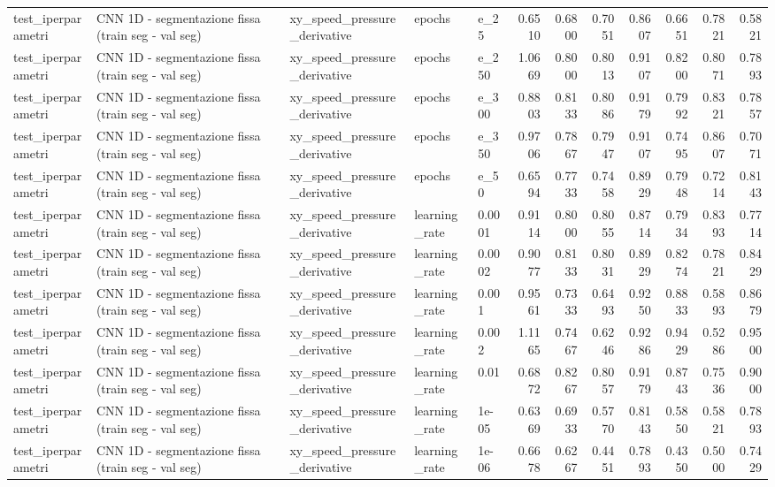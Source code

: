 \documentclass{article}
\begin{document}
\begin{table}[htbp]
\begin{adjustbox}{max width=\textwidth}
\begin{tabular}{lllllrrrrrrr}
test\_iperparametri & CNN 1D - segmentazione fissa (train seg - val seg) & xy\_speed\_pressure\_derivative & epochs & e\_25 & 0.6510 & 0.6800 & 0.7051 & 0.8607 & 0.6651 & 0.7821 & 0.5821 \\
test\_iperparametri & CNN 1D - segmentazione fissa (train seg - val seg) & xy\_speed\_pressure\_derivative & epochs & e\_250 & 1.0669 & 0.8000 & 0.8013 & 0.9107 & 0.8200 & 0.8071 & 0.7893 \\
test\_iperparametri & CNN 1D - segmentazione fissa (train seg - val seg) & xy\_speed\_pressure\_derivative & epochs & e\_300 & 0.8803 & 0.8133 & 0.8086 & 0.9179 & 0.7992 & 0.8321 & 0.7857 \\
test\_iperparametri & CNN 1D - segmentazione fissa (train seg - val seg) & xy\_speed\_pressure\_derivative & epochs & e\_350 & 0.9706 & 0.7867 & 0.7947 & 0.9107 & 0.7495 & 0.8607 & 0.7071 \\
test\_iperparametri & CNN 1D - segmentazione fissa (train seg - val seg) & xy\_speed\_pressure\_derivative & epochs & e\_50 & 0.6594 & 0.7733 & 0.7458 & 0.8929 & 0.7948 & 0.7214 & 0.8143 \\
test\_iperparametri & CNN 1D - segmentazione fissa (train seg - val seg) & xy\_speed\_pressure\_derivative & learning\_rate & 0.0001 & 0.9114 & 0.8000 & 0.8055 & 0.8714 & 0.7934 & 0.8393 & 0.7714 \\
test\_iperparametri & CNN 1D - segmentazione fissa (train seg - val seg) & xy\_speed\_pressure\_derivative & learning\_rate & 0.0002 & 0.9077 & 0.8133 & 0.8031 & 0.8929 & 0.8274 & 0.7821 & 0.8429 \\
test\_iperparametri & CNN 1D - segmentazione fissa (train seg - val seg) & xy\_speed\_pressure\_derivative & learning\_rate & 0.001 & 0.9561 & 0.7333 & 0.6493 & 0.9250 & 0.8833 & 0.5893 & 0.8679 \\
test\_iperparametri & CNN 1D - segmentazione fissa (train seg - val seg) & xy\_speed\_pressure\_derivative & learning\_rate & 0.002 & 1.1165 & 0.7467 & 0.6246 & 0.9286 & 0.9429 & 0.5286 & 0.9500 \\
test\_iperparametri & CNN 1D - segmentazione fissa (train seg - val seg) & xy\_speed\_pressure\_derivative & learning\_rate & 0.01 & 0.6872 & 0.8267 & 0.8057 & 0.9179 & 0.8743 & 0.7536 & 0.9000 \\
test\_iperparametri & CNN 1D - segmentazione fissa (train seg - val seg) & xy\_speed\_pressure\_derivative & learning\_rate & 1e-05 & 0.6369 & 0.6933 & 0.5770 & 0.8143 & 0.5850 & 0.5821 & 0.7893 \\
test\_iperparametri & CNN 1D - segmentazione fissa (train seg - val seg) & xy\_speed\_pressure\_derivative & learning\_rate & 1e-06 & 0.6678 & 0.6267 & 0.4451 & 0.7893 & 0.4350 & 0.5000 & 0.7429 \\

\end{tabular}
\end{adjustbox}
\end{table}
\end{document}
